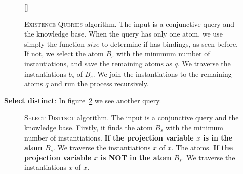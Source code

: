 \documentclass{article}
\begin{document}
\begin{figure}[H]
\captionsetup{singlelinecheck=off}
\centering
    [\FBwidth]
    {\resizebox{!}{0.60\textheight}{%
    
    }}
    {
        \caption[]{\textsc{Existence Queries} algorithm.
        \newline \newline The input is a conjunctive query and the knowledge base.
        \newline \newline When the query has only one atom, we use simply the function $size$ to determine if has bindings, as seen before.
        \newline \newline If not, we select the atom $B_s$ with the minumum number of instantiations, and save the remaining atoms as $q$.
        \newline \newline We traverse the instantiations $b_s$ of $B_s$.
        \newline \newline We join the instantiations to the remaining atoms $q$ and run the process recursively.
        }
    \label{fig:existence_queries}
    }
\end{figure}

\noindent \textbf{Select distinct}: In figure~\ref{fig:select_distinct} we see
another query.

\begin{figure}[H]
\centering
    \resizebox{!}{0.65\textheight}{%
    
    }
    \caption[\textsc{Select Distinct} algorithm.]
    {\textsc{Select Distinct} algorithm.
        \newline \newline The input is a conjunctive query and the knowledge base.
        Firstly, it finds the atom $B_s$ with the minimum number of instantiations.
        \newline \newline \textbf{If the projection variable $x$ is in the atom $B_s$}. We traverse the instantiations $x$ of $x$.
        \newline \newline The atoms.
        \newline \newline \textbf{If the projection variable $x$ is NOT in the atom $B_s$}. We traverse the instantiations $x$ of $x$.
    }
    \label{fig:select_distinct}
\end{figure}
\end{document}
